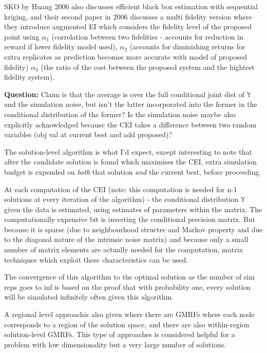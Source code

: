 \message{ !name(SO-Methods.tex)}\documentclass{article}
\begin{document}
SKO by Huang 2006 also discusses efficient black box estimation with sequential kriging, and their second paper in 2006 discusses a multi fidelity version where they introduce augmented EI which considers the fidelity level of the proposed point using $\alpha_1$ (correlation between two fidelities - accounts for reduction in reward if lower fidelity model used), $\alpha_2$ (accounts for diminishing returns for extra replicates as prediction becomes more accurate with model of proposed fidelity) $\alpha_3$ (the ratio of the cost between the proposed system and the hightest fidelity system). \newline

\textbf{Question: } Claim is that the average is over the full conditional joint dist of $\mathbb{Y}$ and the simulation noise, but isn't the latter incorporated into the former in the conditional distribution of the former? Is the simulation noise maybe also explicitly acknowledged because the CEI takes a difference between two random variables (obj val at current best and add proposed)? \newline

The solution-level algorithm is what I'd expect, except interesting to note that after the candidate solution is found which maximises the CEI, extra simulation budget is expended on \emph{both} that solution \emph{and} the current best, before proceeding. \newline

At each computation of the CEI (note: this computation is needed for n-1 solutions at every iteration of the algorithm) - the conditional distribution $\mathbb{Y}$ given the data is estimated, using estimates of parameters within the matrix. The computationally expensive bit is inverting the conditional precision matrix. But because it is sparse (due to neighbourhood structre and Markov property and due to the diagonal nature of the intrinsic noise matrix) and because only a small number of matrix elements are actually needed for the computation, matrix techniques which exploit these characteristics can be used. \newline

The convergence of this algorithm to the optimal solution as the number of sim reps goes to inf is based on the proof that with probability one, every solution will be simulated infinitely often given this algorithm.  \newline

A regional level approachis also given where there are GMRFs where each node corresponds to a region of the solution space, and there are also within-region solution-level GMRFs. This type of approaches is considered helpful for a problem with low dimensionality but a very large number of solutions. \newline
\end{document}
